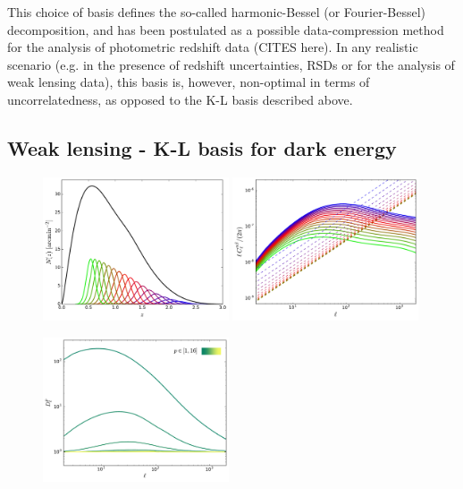 \documentclass[twocolumn,amsfont,amssymb,amsmath, showpacs,balancelastpage, nofootinbib]{revtex4-1}
\begin{document}
    This choice of basis defines the so-called harmonic-Bessel (or Fourier-Bessel) decomposition, and has been postulated as a possible data-compression method for the analysis of photometric redshift data (CITES here). In any realistic scenario (e.g. in the presence of redshift uncertainties, RSDs or for the analysis of weak lensing data), this basis is, however, non-optimal in terms of uncorrelatedness, as opposed to the K-L basis described above.

  \subsection{Weak lensing - K-L basis for dark energy}\label{ssec:results.wl}
    \begin{figure}
      \centering
      \includegraphics[width=0.49\textwidth]{Figs/nz_lsst_wl}
      \includegraphics[width=0.49\textwidth]{Figs/c_ij_wl}
      \caption{}\label{fig:nz_wl}
    \end{figure}
    \begin{figure}
      \centering
      \includegraphics[width=0.49\textwidth]{Figs/d_p_wl}
      \caption{}\label{fig:dp_wl}
    \end{figure}
\end{document}
